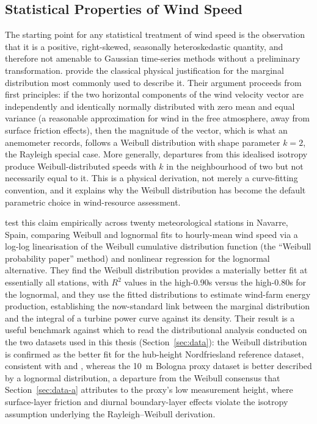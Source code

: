﻿\documentclass[11pt, a4paper, twoside]{article}
\begin{document}
\subsection{Statistical Properties of Wind Speed}
\label{sec:lit-stats}

The starting point for any statistical treatment of wind speed is the observation that it is a positive, right-skewed, seasonally heteroskedastic quantity, and therefore not amenable to Gaussian time-series methods without a preliminary transformation. \citet{TullerBrett1984} provide the classical physical justification for the marginal distribution most commonly used to describe it. Their argument proceeds from first principles: if the two horizontal components of the wind velocity vector are independently and identically normally distributed with zero mean and equal variance (a reasonable approximation for wind in the free atmosphere, away from surface friction effects), then the magnitude of the vector, which is what an anemometer records, follows a Weibull distribution with shape parameter $k = 2$, the Rayleigh special case. More generally, departures from this idealised isotropy produce Weibull-distributed speeds with $k$ in the neighbourhood of two but not necessarily equal to it. This is a physical derivation, not merely a curve-fitting convention, and it explains why the Weibull distribution has become the default parametric choice in wind-resource assessment.

\citet{Garcia1998} test this claim empirically across twenty meteorological stations in Navarre, Spain, comparing Weibull and lognormal fits to hourly-mean wind speed via a log-log linearisation of the Weibull cumulative distribution function (the ``Weibull probability paper'' method) and nonlinear regression for the lognormal alternative. They find the Weibull distribution provides a materially better fit at essentially all stations, with $R^2$ values in the high-0.90s versus the high-0.80s for the lognormal, and they use the fitted distributions to estimate wind-farm energy production, establishing the now-standard link between the marginal distribution and the integral of a turbine power curve against its density. Their result is a useful benchmark against which to read the distributional analysis conducted on the two datasets used in this thesis (Section~\ref{sec:data}): the Weibull distribution is confirmed as the better fit for the hub-height Nordfriesland reference dataset, consistent with \citet{Garcia1998} and \citet{TullerBrett1984}, whereas the 10~m Bologna proxy dataset is better described by a lognormal distribution, a departure from the Weibull consensus that Section~\ref{sec:data-a} attributes to the proxy's low measurement height, where surface-layer friction and diurnal boundary-layer effects violate the isotropy assumption underlying the Rayleigh--Weibull derivation.
\end{document}

